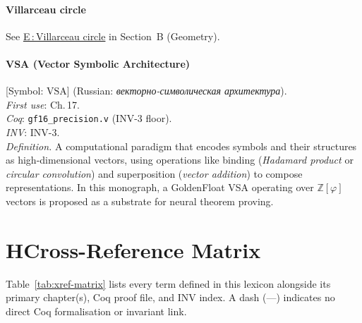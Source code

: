 \paragraph*{\textmd{\textbf{Villarceau circle}}}
\quad See \hyperref[entry:villarceau]{E\,:\,Villarceau circle} in
Section~B (Geometry).

\paragraph*{\textmd{\textbf{VSA (Vector Symbolic Architecture)}}}
\label{entry:vsa}
[Symbol: $\mathrm{VSA}$] (Russian: \textit{векторно-символическая архитектура}).\\
\textit{First use}: Ch.\,17.\\
\textit{Coq}: \texttt{gf16\_precision.v} (INV-3 floor).\\
\textit{INV}: INV-3.\\
\textit{Definition.}
A computational paradigm that encodes symbols and their structures as
high-dimensional vectors, using operations like binding
(\emph{Hadamard product} or \emph{circular convolution}) and
superposition (\emph{vector addition}) to compose representations.
In this monograph, a GoldenFloat VSA operating over $\mathbb{Z}[\varphi]$
vectors is proposed as a substrate for neural theorem proving.

\bigskip

\section*{H\quad Cross-Reference Matrix}
\label{sec:lexicon-xref-matrix}

\noindent
Table~\ref{tab:xref-matrix} lists every term defined in this lexicon
alongside its primary chapter(s), Coq proof file, and INV index.
A dash (---) indicates no direct Coq formalisation or invariant link.

